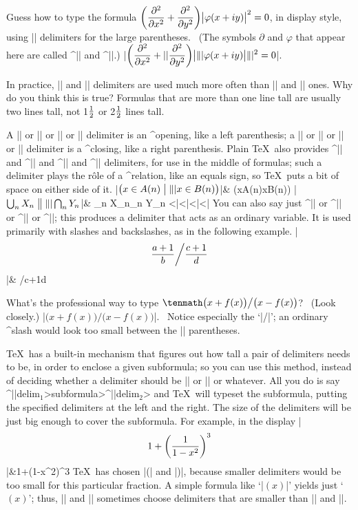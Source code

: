 \medskip
\exercise Guess how to type the formula $\displaystyle
\biggl({\partial^2\over\partial x^2}+{\partial^2\over\partial y^2}
  \biggr)\bigl\vert\varphi(x+iy)\bigr\vert^2=0$, in display style,
using |\bigg| delimiters for the large parentheses. \ (The symbols $\partial$
and $\varphi$ that appear here are called ^|\partial| and ^|\varphi|.)
\answer |$\displaystyle\biggl({\partial^2\over\partial x^2}+|\hfil\break
|{\partial^2\over\partial y^2}\biggr)\bigl|\||\varphi(x+iy)\bigr|\||^2=0$|.

\dangerexercise In practice, |\big| and |\bigg| delimiters are used much
more often than |\Big| and |\Bigg| ones. Why do you think this is true?
\answer Formulas that are more than one line tall are usually two lines tall,
not 1$1\over2$ or 2$1\over2$ lines tall.

\danger A |\bigl| or |\Bigl| or |\biggl| or |\Biggl| delimiter is an
^{opening}, like a left parenthesis;
a |\bigr| or |\Bigr| or |\biggr| or |\Biggr| delimiter is a
^{closing}, like a right parenthesis. Plain \TeX\ also provides
^|\bigm| and ^|\Bigm| and ^|\biggm| and ^|\Biggm| delimiters, for use
in the middle of formulas; such a delimiter plays the r\^ole of a ^{relation},
like an equals sign, so \TeX\ puts a bit of space on either side of it.
\beginlongmathdemo
|$\bigl(x\in A(n)\bigm|\||x\in B(n)\bigr)$|&
  \tenmath\bigl(x\in A(n)\bigm\vert x\in B(n)\bigr)\cr
\noalign{\vskip2pt}
|$\bigcup_n X_n\bigm\|\||\bigcap_n Y_n$|&
  \tenmath\bigcup_n X_n\bigm\Vert\bigcap_n Y_n\cr
\endmathdemo
^^|\bigcup|^^|\bigcap|^^|\verticalline|^^|\in|
You can also say just ^|\big| or ^|\Big| or ^|\bigg| or ^|\Bigg|; this produces
a delimiter that acts as an ordinary variable. It is used primarily with
slashes and backslashes, as in the following example.
\beginlongmathdemo
\noalign{\vskip-2pt}
|$${a+1\over b}\bigg/{c+1\over d}$$|&
  \tenmath{}\bigg/{c+1\over d}\cr
\endmathdemo

\dangerexercise What's the professional way to type
$\tenmath\bigl(x+f(x)\bigr)\big/\bigl(x-f(x)\bigr)$? \ (Look closely.)
\answer |$\bigl(x+f(x)\bigr) \big/ \bigl(x-f(x)\bigr)$|. \ Notice especially
the `|\big/|'; an ordinary ^{slash} would look too small between the
|\big| parentheses.

\TeX\ has a built-in mechanism that figures out how tall a pair of delimiters
needs to be, in order to enclose a given subformula; so you can use this
method, instead of deciding whether a delimiter should be |\big| or
|\bigg| or whatever. All you do is say
\begindisplay
^|\left|\<delim$_1$>\<subformula>^|\right|\<delim$_2$>
\enddisplay
and \TeX\ will typeset the subformula, putting the specified delimiters at
the left and the right. The size of the delimiters will be just big enough
to cover the subformula. For example, in the display
\beginlongdisplaymathdemo
|$$1+\left(1\over1-x^2\right)^3$$|&1+\left(1-x^2\right)^3\cr
\endmathdemo
\TeX\ has chosen |\biggl(| and |\biggr)|, because smaller delimiters
would be too small for this particular fraction. A simple formula like
`|$\left(x\right)$|' yields just `$\left(x\right)$'; thus, |\left| and
|\right| sometimes choose delimiters that are smaller than |\bigl| and |\bigr|.

